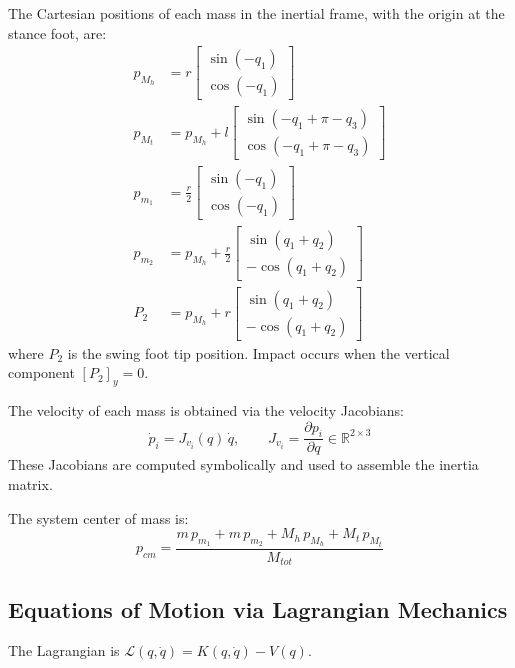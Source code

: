 \documentclass[conference]{IEEEtran}
\begin{document}
The Cartesian positions of each mass in the inertial frame, with the origin at the stance foot, are:
\begin{align}
    p_{M_h} &= r \begin{bmatrix} \sin(-q_1) \\ \cos(-q_1) \end{bmatrix} \label{eq:pmh}\\
    p_{M_t} &= p_{M_h} + l \begin{bmatrix} \sin(-q_1+\pi-q_3) \\ \cos(-q_1+\pi-q_3) \end{bmatrix} \label{eq:pmt}\\
    p_{m_1} &= \frac{r}{2} \begin{bmatrix} \sin(-q_1) \\ \cos(-q_1) \end{bmatrix} \label{eq:pm1}\\
    p_{m_2} &= p_{M_h} + \frac{r}{2} \begin{bmatrix} \sin(q_1+q_2) \\ -\cos(q_1+q_2) \end{bmatrix} \label{eq:pm2}\\
    P_2     &= p_{M_h} + r \begin{bmatrix} \sin(q_1+q_2) \\ -\cos(q_1+q_2) \end{bmatrix} \label{eq:P2}
\end{align}
where $P_2$ is the swing foot tip position. Impact occurs when the vertical component $[P_2]_y = 0$.

The velocity of each mass is obtained via the velocity Jacobians:
\begin{equation}
    \dot{p}_i = J_{v_i}(q)\,\dot{q}, \qquad J_{v_i} = \frac{\partial p_i}{\partial q} \in \mathbb{R}^{2\times 3}
\end{equation}
These Jacobians are computed symbolically and used to assemble the inertia matrix.

The system center of mass is:
\begin{equation}
    p_{cm} = \frac{m\,p_{m_1} + m\,p_{m_2} + M_h\,p_{M_h} + M_t\,p_{M_t}}{M_{tot}}
\end{equation}

\subsection{Equations of Motion via Lagrangian Mechanics}

The Lagrangian is $\mathcal{L}(q,\dot{q}) = K(q,\dot{q}) - V(q)$.
\end{document}
